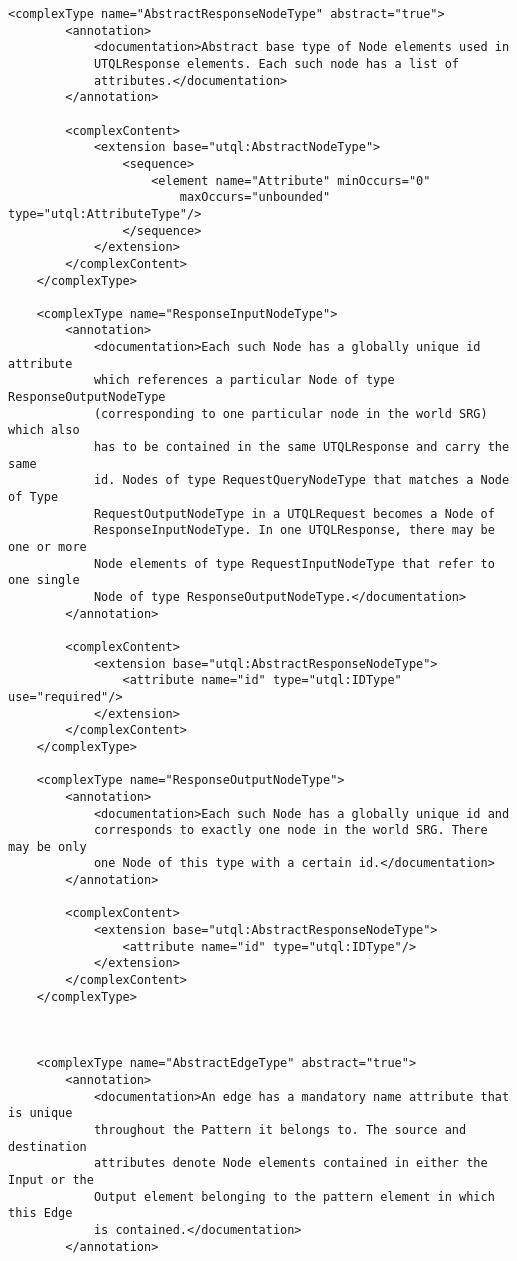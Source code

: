 \documentclass[11pt]{article}
\begin{document}
\begin{Verbatim}[fontsize=\footnotesize,tabsize=2]
    <complexType name="AbstractResponseNodeType" abstract="true">
        <annotation>
            <documentation>Abstract base type of Node elements used in
            UTQLResponse elements. Each such node has a list of
            attributes.</documentation>
        </annotation>
        
        <complexContent>
            <extension base="utql:AbstractNodeType">
                <sequence>
                    <element name="Attribute" minOccurs="0"
						maxOccurs="unbounded" type="utql:AttributeType"/>
                </sequence>
            </extension>
        </complexContent>        
    </complexType>
    
    <complexType name="ResponseInputNodeType">
        <annotation>
            <documentation>Each such Node has a globally unique id attribute
            which references a particular Node of type ResponseOutputNodeType
            (corresponding to one particular node in the world SRG) which also
            has to be contained in the same UTQLResponse and carry the same
            id. Nodes of type RequestQueryNodeType that matches a Node of Type
            RequestOutputNodeType in a UTQLRequest becomes a Node of
            ResponseInputNodeType. In one UTQLResponse, there may be one or more
            Node elements of type RequestInputNodeType that refer to one single
            Node of type ResponseOutputNodeType.</documentation>
        </annotation>
        
        <complexContent>
            <extension base="utql:AbstractResponseNodeType">
                <attribute name="id" type="utql:IDType" use="required"/>
            </extension>
        </complexContent>
    </complexType>
    
    <complexType name="ResponseOutputNodeType">
        <annotation>
            <documentation>Each such Node has a globally unique id and
            corresponds to exactly one node in the world SRG. There may be only
            one Node of this type with a certain id.</documentation>
        </annotation>
        
        <complexContent>
            <extension base="utql:AbstractResponseNodeType">
                <attribute name="id" type="utql:IDType"/>
            </extension>
        </complexContent>
    </complexType>
    
    
    
    <complexType name="AbstractEdgeType" abstract="true">
        <annotation>
            <documentation>An edge has a mandatory name attribute that is unique
            throughout the Pattern it belongs to. The source and destination
            attributes denote Node elements contained in either the Input or the
            Output element belonging to the pattern element in which this Edge
            is contained.</documentation>
        </annotation>
        

\end{Verbatim}
\end{document}
